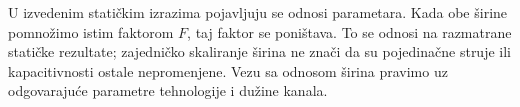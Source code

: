 U izvedenim statičkim izrazima pojavljuju se odnosi parametara. Kada obe širine pomnožimo istim faktorom $F$, taj faktor se poništava. To se odnosi na razmatrane statičke rezultate; zajedničko skaliranje širina ne znači da su pojedinačne struje ili kapacitivnosti ostale nepromenjene. Vezu sa odnosom širina pravimo uz odgovarajuće parametre tehnologije i dužine kanala.

